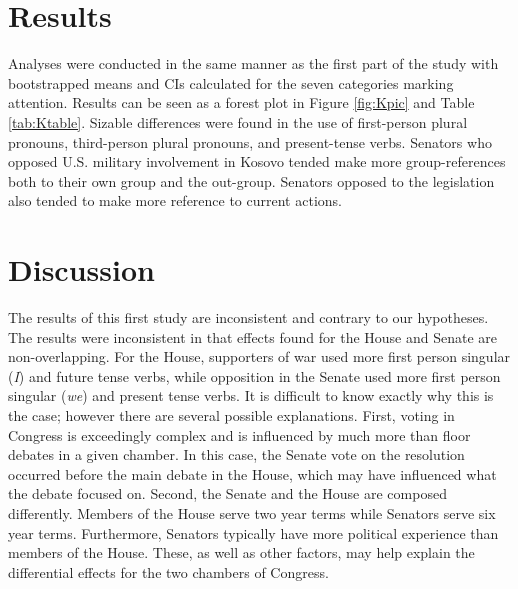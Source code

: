 \documentclass[english,,man]{apa6}
\theoremstyle{definition}
\theoremstyle{definition}
\theoremstyle{definition}
\theoremstyle{remark}
\begin{document}
\hypertarget{results-1}{%
\section{Results}\label{results-1}}

Analyses were conducted in the same manner as the first part of the
study with bootstrapped means and CIs calculated for the seven
categories marking attention. Results can be seen as a forest plot in
Figure \ref{fig:Kpic} and Table \ref{tab:Ktable}. Sizable differences
were found in the use of first-person plural pronouns, third-person
plural pronouns, and present-tense verbs. Senators who opposed U.S.
military involvement in Kosovo tended make more group-references both to
their own group and the out-group. Senators opposed to the legislation
also tended to make more reference to current actions.

\hypertarget{discussion}{%
\section{Discussion}\label{discussion}}

The results of this first study are inconsistent and contrary to our
hypotheses. The results were inconsistent in that effects found for the
House and Senate are non-overlapping. For the House, supporters of war
used more first person singular (\emph{I}) and future tense verbs, while
opposition in the Senate used more first person singular (\emph{we}) and
present tense verbs. It is difficult to know exactly why this is the
case; however there are several possible explanations. First, voting in
Congress is exceedingly complex and is influenced by much more than
floor debates in a given chamber. In this case, the Senate vote on the
resolution occurred before the main debate in the House, which may have
influenced what the debate focused on. Second, the Senate and the House
are composed differently. Members of the House serve two year terms
while Senators serve six year terms. Furthermore, Senators typically
have more political experience than members of the House. These, as well
as other factors, may help explain the differential effects for the two
chambers of Congress.
\end{document}
